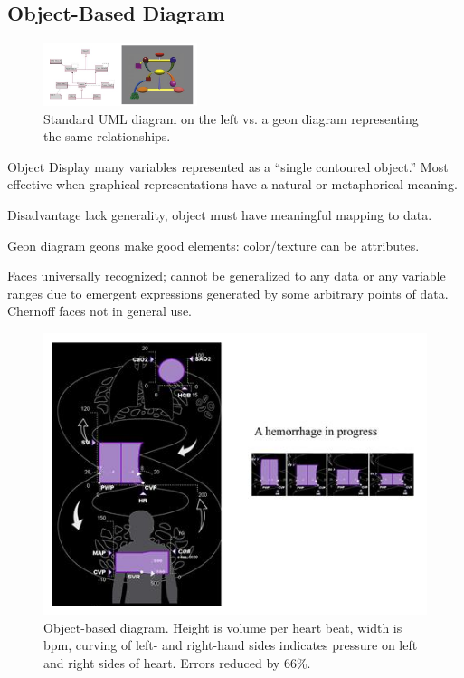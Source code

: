 \begin{mdframed}\begin{multicols}{2}
\subsection{Object-Based Diagram}
\begin{figure}[H]\centering
    \includegraphics[width=0.4\textwidth]{uml_old_vs_geons.png}
    \caption{Standard UML diagram on the left vs. a geon diagram representing
    the same relationships.}
\end{figure}

\begin{compactdesc}
    \item[Object Display] many variables represented as a ``single contoured
        object.'' Most effective when graphical representations have a natural
        or metaphorical meaning.
    \item[Disadvantage] lack generality, object must have meaningful mapping to
        data.
    \item[Geon diagram] geons make good elements: color/texture can be
        attributes.
    \item[Faces] universally recognized; cannot be generalized to any data or
        any variable ranges due to emergent expressions generated by some
        arbitrary points of data. Chernoff faces not in general use.
\end{compactdesc}

\begin{figure}[H]\centering
    \includegraphics[width=\linewidth]{object_based_anesthesiologist.png}
    \caption{Object-based diagram. Height is volume per heart beat, width is bpm,
    curving of left- and right-hand sides indicates pressure on left and
    right sides of heart. Errors reduced by 66\%.}
\end{figure}
\end{multicols}\end{mdframed}

